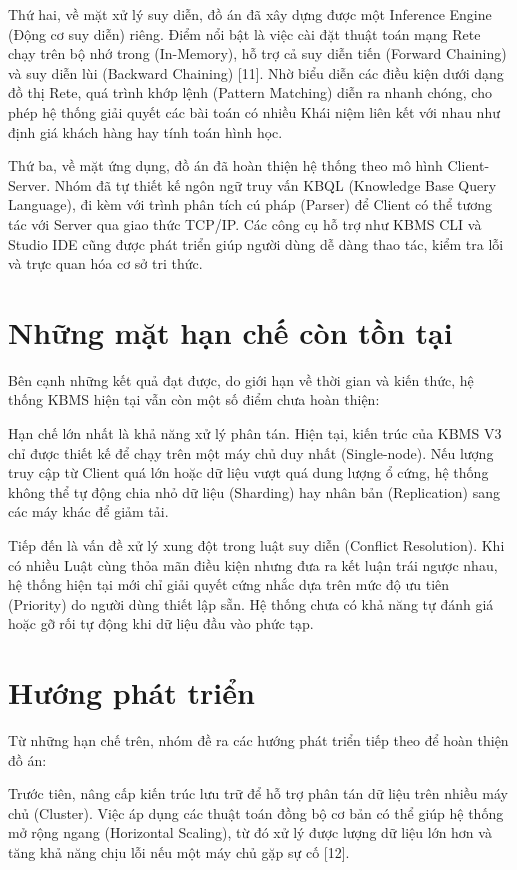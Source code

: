 \documentclass[13pt,a4paper,oneside]{extreport}
\begin{document}
Thứ hai, về mặt xử lý suy diễn, đồ án đã xây dựng được một Inference Engine (Động cơ suy diễn) riêng. Điểm nổi bật là việc cài đặt thuật toán mạng Rete chạy trên bộ nhớ trong (In-Memory), hỗ trợ cả suy diễn tiến (Forward Chaining) và suy diễn lùi (Backward Chaining) [11]. Nhờ biểu diễn các điều kiện dưới dạng đồ thị Rete, quá trình khớp lệnh (Pattern Matching) diễn ra nhanh chóng, cho phép hệ thống giải quyết các bài toán có nhiều Khái niệm liên kết với nhau như định giá khách hàng hay tính toán hình học.


Thứ ba, về mặt ứng dụng, đồ án đã hoàn thiện hệ thống theo mô hình Client-Server. Nhóm đã tự thiết kế ngôn ngữ truy vấn KBQL (Knowledge Base Query Language), đi kèm với trình phân tích cú pháp (Parser) để Client có thể tương tác với Server qua giao thức TCP/IP. Các công cụ hỗ trợ như KBMS CLI và Studio IDE cũng được phát triển giúp người dùng dễ dàng thao tác, kiểm tra lỗi và trực quan hóa cơ sở tri thức.


\section{Những mặt hạn chế còn tồn tại}


Bên cạnh những kết quả đạt được, do giới hạn về thời gian và kiến thức, hệ thống KBMS hiện tại vẫn còn một số điểm chưa hoàn thiện:


Hạn chế lớn nhất là khả năng xử lý phân tán. Hiện tại, kiến trúc của KBMS V3 chỉ được thiết kế để chạy trên một máy chủ duy nhất (Single-node). Nếu lượng truy cập từ Client quá lớn hoặc dữ liệu vượt quá dung lượng ổ cứng, hệ thống không thể tự động chia nhỏ dữ liệu (Sharding) hay nhân bản (Replication) sang các máy khác để giảm tải.


Tiếp đến là vấn đề xử lý xung đột trong luật suy diễn (Conflict Resolution). Khi có nhiều Luật cùng thỏa mãn điều kiện nhưng đưa ra kết luận trái ngược nhau, hệ thống hiện tại mới chỉ giải quyết cứng nhắc dựa trên mức độ ưu tiên (Priority) do người dùng thiết lập sẵn. Hệ thống chưa có khả năng tự đánh giá hoặc gỡ rối tự động khi dữ liệu đầu vào phức tạp.


\section{Hướng phát triển}


Từ những hạn chế trên, nhóm đề ra các hướng phát triển tiếp theo để hoàn thiện đồ án:


Trước tiên, nâng cấp kiến trúc lưu trữ để hỗ trợ phân tán dữ liệu trên nhiều máy chủ (Cluster). Việc áp dụng các thuật toán đồng bộ cơ bản có thể giúp hệ thống mở rộng ngang (Horizontal Scaling), từ đó xử lý được lượng dữ liệu lớn hơn và tăng khả năng chịu lỗi nếu một máy chủ gặp sự cố [12].
\end{document}
